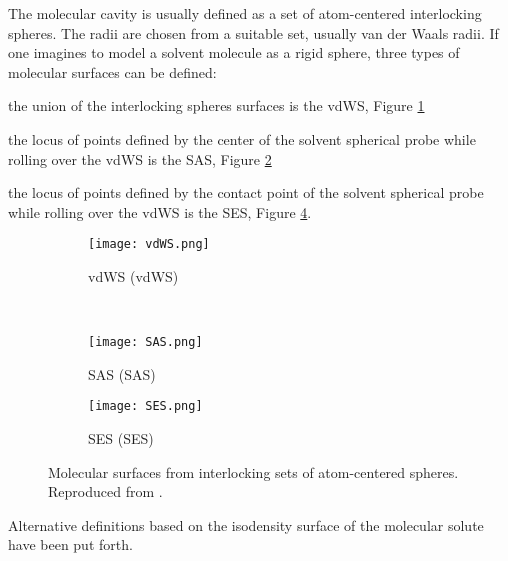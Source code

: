 The molecular cavity is usually defined as a set of atom-centered
interlocking spheres. The radii are chosen from a suitable set, usually
van der Waals radii.\autocite{Bondi1964-dt, Mantina2009-hb}
If one imagines to model a solvent molecule as a rigid sphere,
three types of molecular surfaces can be defined:
\begin{enumerate*}[label={\alph*)},font={\color{PMS1797}}]
  \item
    the union of the interlocking spheres surfaces is the \gls{vdWS},
    Figure \ref{fig:vdWS}
  \item the locus of points defined by the center of the solvent
    spherical probe while rolling over the \acrshort{vdWS} is the
    \gls{SAS}, Figure \ref{fig:SAS}
  \item the locus of points defined by the contact point of the solvent
    spherical probe while rolling over the \acrshort{vdWS} is the \gls{SES}, Figure \ref{fig:SES}.
\end{enumerate*}
\begin{figure}[tb]
 \centering
 \begin{subfigure}{.45\textwidth}
   \centering
   \texttt{[image: vdWS.png]}
   \caption{\acrlong*{vdWS} (\acrshort{vdWS})}
   \label{fig:vdWS}
 \end{subfigure}
 ~
 \begin{subfigure}{.45\textwidth}
   \centering
   \texttt{[image: SAS.png]}
   \caption{\acrlong*{SAS} (\acrshort{SAS})}
   \label{fig:SAS}
 \end{subfigure}

 \begin{subfigure}{.45\textwidth}
   \centering
   \texttt{[image: SES.png]}
   \caption{\acrlong*{SES} (\acrshort{SES})}
   \label{fig:SES}
 \end{subfigure}
 \caption{Molecular surfaces from interlocking sets of atom-centered spheres.
 Reproduced from .}
\end{figure}
Alternative definitions based on the isodensity surface of the molecular solute
have been put forth.\autocite{Foresman1996-wv}

